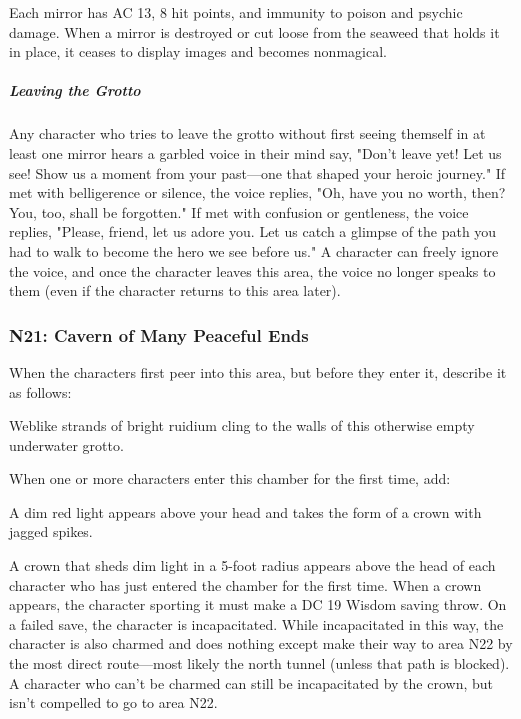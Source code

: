 \documentclass[10pt,a4paper,twoside,fancy,bg=print,twocolumn,openany,nodeprecatedcode]{dndbook}
\begin{document}
Each mirror has AC 13, 8 hit points, and immunity to poison and psychic damage. When a mirror is destroyed or cut loose from the seaweed that holds it in place, it ceases to display images and becomes nonmagical.

\subparagraph{Leaving the Grotto}
Any character who tries to leave the grotto without first seeing themself in at least one mirror hears a garbled voice in their mind say, "Don't leave yet! Let us see! Show us a moment from your past—one that shaped your heroic journey." If met with belligerence or silence, the voice replies, "Oh, have you no worth, then? You, too, shall be forgotten." If met with confusion or gentleness, the voice replies, "Please, friend, let us adore you. Let us catch a glimpse of the path you had to walk to become the hero we see before us." A character can freely ignore the voice, and once the character leaves this area, the voice no longer speaks to them (even if the character returns to this area later).

\subsubsection{N21: Cavern of Many Peaceful Ends}
When the characters first peer into this area, but before they enter it, describe it as follows:

\begin{DndReadAloud}{}
Weblike strands of bright ruidium cling to the walls of this otherwise empty underwater grotto.

\end{DndReadAloud}

When one or more characters enter this chamber for the first time, add:

\begin{DndReadAloud}{}
A dim red light appears above your head and takes the form of a crown with jagged spikes.

\end{DndReadAloud}

A crown that sheds dim light in a 5-foot radius appears above the head of each character who has just entered the chamber for the first time. When a crown appears, the character sporting it must make a DC 19 Wisdom saving throw. On a failed save, the character is incapacitated. While incapacitated in this way, the character is also charmed and does nothing except make their way to area N22 by the most direct route—most likely the north tunnel (unless that path is blocked). A character who can't be charmed can still be incapacitated by the crown, but isn't compelled to go to area N22.
\end{document}
